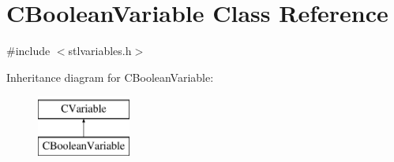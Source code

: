 \hypertarget{classCBooleanVariable}{\section{C\-Boolean\-Variable Class Reference}
\label{classCBooleanVariable}
}


{\ttfamily \#include $<$stlvariables.\-h$>$}

Inheritance diagram for C\-Boolean\-Variable\-:\begin{figure}[H]
\begin{center}
\leavevmode
\includegraphics[height=2.000000cm]{d3/de8/classCBooleanVariable}
\end{center}
\end{figure}
